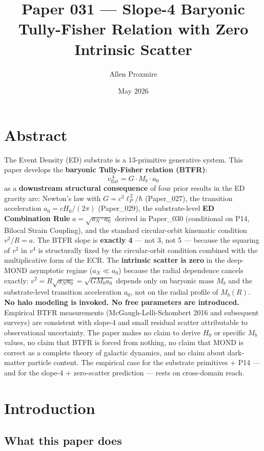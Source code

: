 \documentclass[11pt,a4paper]{article}
\title{\vspace{-1cm}\Large\bfseries Paper 031 --- Slope-4 Baryonic Tully-Fisher Relation with Zero Intrinsic Scatter}
\author{Allen Proxmire}
\date{May 2026}
\begin{document}
\maketitle

\section*{Abstract}

The Event Density (ED) substrate is a 13-primitive generative system. This paper develops the \textbf{baryonic Tully-Fisher relation (BTFR)}:
\[
v_\mathrm{flat}^{\,4} = G \cdot M_b \cdot a_0
\]
as a \textbf{downstream structural consequence} of four prior results in the ED gravity arc: Newton's law with $G = c^3\ell_P^{\,2}/\hbar$ (Paper\_027), the transition acceleration $a_0 = cH_0/(2\pi)$ (Paper\_029), the substrate-level \textbf{ED Combination Rule} $a = \sqrt{a_N \cdot a_0}$ derived in Paper\_030 (conditional on P14, Bilocal Strain Coupling), and the standard circular-orbit kinematic condition $v^2/R = a$. The BTFR slope is \textbf{exactly 4} --- not 3, not 5 --- because the squaring of $v^2$ in $v^4$ is structurally fixed by the circular-orbit condition combined with the multiplicative form of the ECR. The \textbf{intrinsic scatter is zero} in the deep-MOND asymptotic regime ($a_N \ll a_0$) because the radial dependence cancels exactly: $v^2 = R\sqrt{a_N a_0} = \sqrt{GM_b a_0}$ depends only on baryonic mass $M_b$ and the substrate-level transition acceleration $a_0$, not on the radial profile of $M_b(R)$. \textbf{No halo modeling is invoked. No free parameters are introduced.} Empirical BTFR measurements (McGaugh-Lelli-Schombert 2016 and subsequent surveys) are consistent with slope-4 and small residual scatter attributable to observational uncertainty. The paper makes no claim to derive $H_0$ or specific $M_b$ values, no claim that BTFR is forced from nothing, no claim that MOND is correct as a complete theory of galactic dynamics, and no claim about dark-matter particle content. The empirical case for the substrate primitives + P14 --- and for the slope-4 + zero-scatter prediction --- rests on cross-domain reach.

\section{Introduction}

\subsection{What this paper does}
\end{document}
